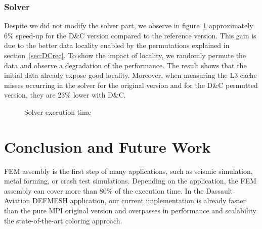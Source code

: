 \documentclass{IOS-Book-Article}
\begin{document}
\subsubsection{Solver}
Despite we did not modify the solver part, we observe in figure~\ref{fig:solCurves} approximately 6\% speed-up for the D\&C version compared to the reference version.
This gain is due to the better data locality enabled by the permutations explained in section~\ref{sec:DCrec}.
To show the impact of locality, we randomly permute the data and observe a degradation of the performance.
The result shows that the initial data already expose good locality.
Moreover, when measuring the L3 cache misses occurring in the solver for the original version and for the D\&C permutted version, they are 23\% lower with D\&C.

\begin{figure}[htp]
 \centering
 \caption{Solver execution time}
 \label{fig:solCurves}
\end{figure}

\section{Conclusion and Future Work}
FEM assembly is the first step of many applications, such as seismic simulation, metal forming, or crash test simulations.
Depending on the application, the FEM assembly can cover more than 80\% of the execution time.
In the Dassault Aviation DEFMESH application, our current implementation is already faster than the pure MPI original version and overpasses in performance and scalability the state-of-the-art coloring approach.
\end{document}
